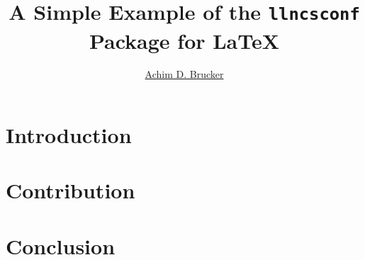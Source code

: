 \documentclass[final, runningheads, USenglish, pdftex]{llncs}
\title{A Simple Example of the \texttt{llncsconf} Package for \LaTeX}
\author{\protect\href{http://www.brucker.ch/}{Achim D. Brucker}}
\institute{Some Departement, Somewhere}
\begin{document}
\maketitle{}
\begin{abstract}
\lipsum[1-2]
\end{abstract}

\section{Introduction}
\lipsum[1-4]

\section{Contribution}
\lipsum[5-10]

\section{Conclusion}
\lipsum[10-12]
\end{document}
